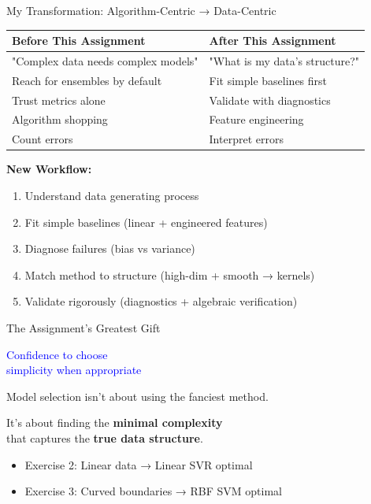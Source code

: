 \documentclass[aspectratio=169]{beamer}
\begin{document}
\begin{frame}{My Transformation: Algorithm-Centric → Data-Centric}

\begin{center}
\begin{tabular}{p{} p{}}
\toprule
\textbf{Before This Assignment} & \textbf{After This Assignment} \\
\midrule
"Complex data needs complex models" & "What is my data's structure?" \\
\midrule
Reach for ensembles by default & Fit simple baselines first \\
\midrule
Trust metrics alone & Validate with diagnostics \\
\midrule
Algorithm shopping & Feature engineering \\
\midrule
Count errors & Interpret errors \\
\bottomrule
\end{tabular}
\end{center}

\vspace{0.5cm}
\textbf{New Workflow:}
\begin{enumerate}
\item Understand data generating process
\item Fit simple baselines (linear + engineered features)
\item Diagnose failures (bias vs variance)
\item Match method to structure (high-dim + smooth → kernels)
\item Validate rigorously (diagnostics + algebraic verification)
\end{enumerate}

\end{frame}

\begin{frame}{The Assignment's Greatest Gift}

\begin{center}
\Huge
\textcolor{blue}{Confidence to choose\\
simplicity when appropriate}
\end{center}

\vspace{1cm}

\Large
Model selection isn't about using the fanciest method.

\vspace{0.3cm}

It's about finding the \textbf{minimal complexity}\\
that captures the \textbf{true data structure}.

\vspace{0.5cm}

\normalsize
\begin{itemize}
\item Exercise 2: Linear data → Linear SVR optimal
\item Exercise 3: Curved boundaries → RBF SVM optimal
\end{itemize}

\end{frame}
\end{document}
